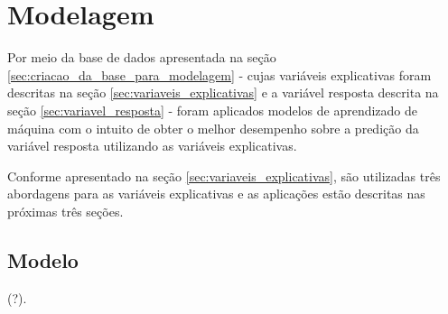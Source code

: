 \chapter{Modelagem}
\label{cap:modelagem}

Por meio da base de dados apresentada na seção \ref{sec:criacao_da_base_para_modelagem} - cujas variáveis explicativas foram descritas na seção \ref{sec:variaveis_explicativas} e a variável resposta descrita na seção \ref{sec:variavel_resposta} - foram aplicados modelos de aprendizado de máquina com o intuito de obter o melhor desempenho sobre a predição da variável resposta utilizando as variáveis explicativas.

Conforme apresentado na seção \ref{sec:variaveis_explicativas}, são utilizadas três abordagens para as variáveis explicativas e as aplicações estão descritas nas próximas três seções.

\section{Modelo}
\label{sec:modelo}

(?).



